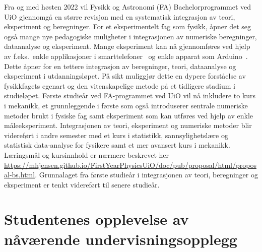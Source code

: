 \documentclass{article}
\begin{document}
Fra og med høsten 2022 vil Fysikk og Astronomi (FA) Bachelorprogrammet ved UiO gjennomgå en større revisjon med 
en systematisk integrasjon av teori, eksperiment og beregninger.
For et eksperimentelt fag som fysikk, åpner det seg også mange nye pedagogiske muligheter i integrasjonen av numeriske beregninger, dataanalyse og eksperiment. Mange eksperiment kan nå gjennomføres ved hjelp av f.eks.\ enkle applikasjoner i smarttelefoner~\cite{phyphox} og enkle apparat som Arduino~\cite{arduino}. Dette åpner for en tettere integrasjon av beregninger, teori, dataanalyse og eksperiment i utdanningsløpet. På sikt muliggjør dette en dypere forståelse av fysikkfagets egenart og den vitenskapelige metode på et tidligere stadium i studieløpet.  Første studieår ved FA-programmet ved UiO vil nå inkludere to kurs i mekanikk, et grunnleggende i første som også introduserer sentrale numeriske metoder brukt i fysiske fag samt eksperiment som kan utføres ved hjelp av enkle måleeksperiment. Integrasjonen av teori, eksperiment og numeriske metoder blir videreført i andre semester med et kurs i statistikk, sannsylighetslære og statistisk data-analyse for fysikere samt et mer avansert kurs i mekanikk.
Læringsmål og kursinnhold er nærmere beskrevet her \url{https://mhjensen.github.io/FirstYearPhysicsUiO/doc/pub/proposal/html/proposal-bs.html}.
Grunnalaget fra første studieår i integrasjonen av teori, beregninger og eksperiment er tenkt videreført til senere studieår. 



\section{Studentenes opplevelse av nåværende undervisningsopplegg}
\end{document}
